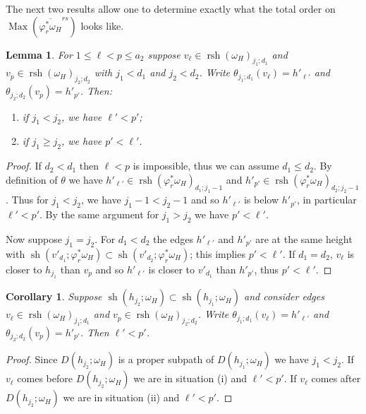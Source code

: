 \documentclass{amsart}
\newtheorem{corollary}[theorem]{Corollary}
\newtheorem{lemma}[theorem]{Lemma}
\newcommand{\Max}{\operatorname{Max}}
\newcommand{\rsh}{\operatorname{rsh}}
\newcommand{\sh}{\operatorname{sh}}
\newenvironment{enumeratei}{\begin{enumerate}[\upshape (i)]}
                           {\end{enumerate}}
\begin{document}
 The next two results allow one to determine exactly what the total order on $\Max(\overline{\varphi_r^*\omega_H}^{rs})$ looks like.
 \begin{lemma}
  For $1\le\ell<p\le a_2$ suppose $v_\ell\in\rsh(\omega_H)_{j_1;d_1}$ and $v_p\in\rsh(\omega_H)_{j_2;d_2}$ with $j_1<d_1$ and $j_2<d_2$.  Write $\theta_{j_1;d_1}(v_\ell)=h'_{\ell'}$ and $\theta_{j_2;d_2}(v_p)=h'_{p'}$.  Then:
  \begin{enumeratei}
   \item if $j_1<j_2$, we have $\ell'<p'$;
   \item if $j_1\ge j_2$, we have $p'<\ell'$.
  \end{enumeratei}
 \end{lemma}
 \begin{proof}
  If $d_2<d_1$ then $\ell<p$ is impossible, thus we can assume $d_1\le d_2$.  By definition of $\theta$ we have $h'_{\ell'}\in\rsh(\varphi^*_r\omega_H)_{d_1;j_1-1}$ and $h'_{p'}\in\rsh(\varphi^*_r\omega_H)_{d_2;j_2-1}$.  Thus for $j_1<j_2$, we have $j_1-1<j_2-1$ and so $h'_{\ell'}$ is below $h'_{p'}$, in particular $\ell'<p'$.  By the same argument for $j_1>j_2$ we have $p'<\ell'$.

  Now suppose $j_1=j_2$.  For $d_1<d_2$ the edges $h'_{\ell'}$ and $h'_{p'}$ are at the same height with $\sh(v'_{d_1};\varphi^*_r\omega_H)\subset\sh(v'_{d_2};\varphi^*_r\omega_H)$; this implies $p'<\ell'$.  If $d_1=d_2$, $v_\ell$ is closer to $h_{j_1}$ than $v_p$ and so $h'_{\ell'}$ is closer to $v'_{d_1}$ than $h'_{p'}$, thus $p'<\ell'$.
 \end{proof}
 \begin{corollary}
  Suppose $\sh(h_{j_2};\omega_H)\subset\sh(h_{j_1};\omega_H)$ and consider edges $v_\ell\in\rsh(\omega_H)_{j_1;d_1}$ and $v_p\in\rsh(\omega_H)_{j_2;d_2}$.  Write $\theta_{j_1;d_1}(v_\ell)=h'_{\ell'}$ and $\theta_{j_2;d_2}(v_p)=h'_{p'}$.  Then $\ell'<p'$.
 \end{corollary}
 \begin{proof}
  Since $D(h_{j_2};\omega_H)$ is a proper subpath of $D(h_{j_1};\omega_H)$ we have $j_1<j_2$.  If $v_\ell$ comes before $D(h_{j_2};\omega_H)$ we are in situation (i) and $\ell'<p'$.  If $v_\ell$ comes after $D(h_{j_2};\omega_H)$ we are in situation (ii) and $\ell'<p'$.
 \end{proof}
\end{document}
